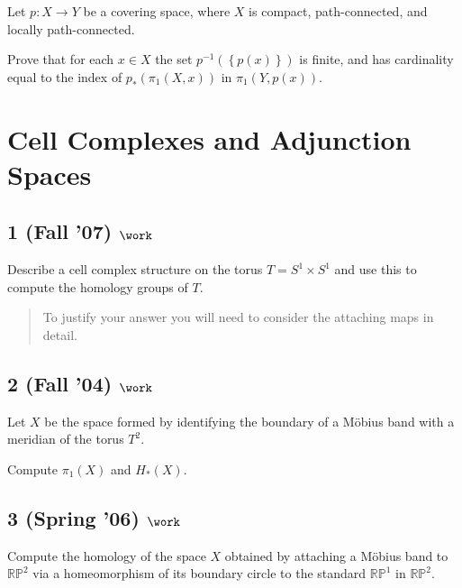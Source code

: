 Let \(p : X \to Y\) be a covering space, where \(X\) is compact,
path-connected, and locally path-connected.

Prove that for each \(x \in X\) the set
\(p^{-1}(\left\{{p(x)}\right\})\) is finite, and has cardinality equal
to the index of \(p_* (\pi_1 (X, x))\) in \(\pi_1 (Y, p(x))\).

\hypertarget{cell-complexes-and-adjunction-spaces}{%
\section{Cell Complexes and Adjunction
Spaces}\label{cell-complexes-and-adjunction-spaces}}

\hypertarget{fall-07-work-1}{%
\subsection{\texorpdfstring{1 (Fall '07)
\(\work\)}{1 (Fall '07) \textbackslash work}}\label{fall-07-work-1}}

Describe a cell complex structure on the torus \(T = S^1 \times S^1\)
and use this to compute the homology groups of \(T\).

\begin{quote}
To justify your answer you will need to consider the attaching maps in
detail.
\end{quote}

\hypertarget{fall-04-work-3}{%
\subsection{\texorpdfstring{2 (Fall '04)
\(\work\)}{2 (Fall '04) \textbackslash work}}\label{fall-04-work-3}}

Let \(X\) be the space formed by identifying the boundary of a Möbius
band with a meridian of the torus \(T^2\).

Compute \(\pi_1 (X)\) and \(H_* (X)\).

\hypertarget{spring-06-work-3}{%
\subsection{\texorpdfstring{3 (Spring '06)
\(\work\)}{3 (Spring '06) \textbackslash work}}\label{spring-06-work-3}}

Compute the homology of the space \(X\) obtained by attaching a Möbius
band to \({\mathbb{RP}}^2\) via a homeomorphism of its boundary circle
to the standard \({\mathbb{RP}}^1\) in \({\mathbb{RP}}^2\).

